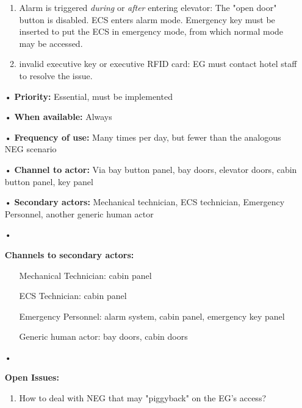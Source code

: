 \documentclass[12pt]{article}
\begin{document}
\begin{itemize}
{\begin{enumerate}
		        	\item Alarm is triggered \textit{during} or \textit{after} entering elevator: The "open door" button is disabled.
		        	ECS enters alarm mode. Emergency key must be inserted to put the ECS in emergency mode, from which normal mode may
		        	be accessed.
		        	\item invalid executive key or executive RFID card: EG must contact hotel staff to resolve the issue.
		        \end{enumerate}}
			\item[•] \textbf{Priority:} Essential, must be implemented
			\item[•] \textbf{When available:} Always
			\item[•] \textbf{Frequency of use:} Many times per day, but fewer than the analogous NEG scenario
			\item[•] \textbf{Channel to actor:} Via bay button panel, bay doors, elevator doors, cabin button panel, key panel
			\item[•] \textbf{Secondary actors:} Mechanical technician, ECS technician, Emergency Personnel, another 
			generic human actor		
			\item[•]{\textbf{Channels to secondary actors:}
			    \begin{itemize}
					\item[] Mechanical Technician: cabin panel
					\item[] ECS Technician: cabin panel
					\item[] Emergency Personnel: alarm system, cabin panel, emergency key panel	
					\item[] Generic human actor: bay doors, cabin doors    
			    \end{itemize}}
			\item[•]{\textbf{Open Issues:}
				\begin{enumerate}
					\item How to deal with NEG that may "piggyback" on the EG's access?
				\end{enumerate}} 
		\end{itemize}	
		
\end{document}
